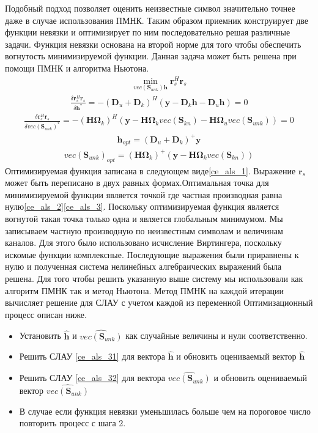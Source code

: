 Подобный подход позволяет оценить неизвестные символ значительно точнее даже  в случае использования ПМНК.  Таким образом приемник конструирует две функции невязки и оптимизирует по ним последовательно решая различные задачи. Функция невязки основана на второй норме для того чтобы обеспечить вогнутость минимизируемой функции. Данная задача может быть решена при помощи ПМНК и алгоритма Ньютона.
   \begin{align}
 \min_{vec(\mathbf{S}_{unk})\mathbf{h}}\mathbf{r}_s^H\mathbf{r}_s
 \label{ce_als_1}
 \end{align}
\begin{align}
\frac{\delta\mathbf{r}_s^H\mathbf{r}_s}{\delta\mathbf{h}^*}=-(\mathbf{D}_u+\mathbf{D}_k)^H(\mathbf{y}-\mathbf{D}_k\mathbf{h}-\mathbf{D}_u\mathbf{h})=0
\label{ce_als_2}
\end{align}
\begin{align}
\frac{\delta\mathbf{r}_s^H\mathbf{r}_s}{\delta vec(\mathbf{S}_{unk})^*}=-(\mathbf{H}\mathbf{\Omega}_k)^H(\mathbf{y}-\mathbf{H}\mathbf{\Omega}_kvec(\mathbf{S}_{kn})-\mathbf{H}\mathbf{\Omega}_uvec(\mathbf{S}_{unk}))=0
\label{ce_als_3}
\end{align}
\begin{align}
\mathbf{h}_{opt}=(\mathbf{D}_u+\mathbf{D}_k)^+\mathbf{y}
\label{ce_als_31}
\end{align}
\begin{align}
vec(\mathbf{S}_{unk})_{opt}=(\mathbf{H}\mathbf{\Omega}_k)^+(\mathbf{y}-\mathbf{H}\mathbf{\Omega}_kvec(\mathbf{S}_{kn}))
\label{ce_als_32}
\end{align}
Оптимизируемая функция записана в следующем виде\eqref{ce_als_1}. Выражение   $\mathbf{r}_s$ может быть переписано в двух равных формах.Оптимальная точка для минимизируемой функции является точкой где частная производная равна нулю\eqref{ce_als_2}\eqref{ce_als_3}. Поскольку оптимизируемая функция является вогнутой такая точка только одна и является глобальным минимумом. Мы записываем частную производную по неизвестным символам и величинам каналов. Для этого было использовано исчисление Виртингера, поскольку искомые функции комплексные. 
Последующие выражения были приравнены к нулю и полученная система нелинейных алгебраических выражений была решена. Для того чтобы решить указанную выше систему мы использовали как алгоритм ПМНК так и метод Ньютона.
Метод ПМНК на каждой итерации вычисляет решение для СЛАУ с учетом каждой из переменной Оптимизационный процесс описан ниже.
\begin{itemize}
\item Установить $\hat{\mathbf{h}}$ и $\hat{vec(\mathbf{S}_{unk})}$ как случайные величины и нули соответственно.
\item Решить СЛАУ \eqref{ce_als_31} для вектора $\hat{\mathbf{h}}$ и обновить оцениваемый вектор $\hat{\mathbf{h}}$
\item Решить СЛАУ \eqref{ce_als_32} для вектора $\hat{vec(\mathbf{S}_{unk})}$ и обновить оцениваемый вектор $\hat{vec(\mathbf{S}_{unk})}$
\item  В случае если функция невязки уменьшилась больше чем на пороговое число повторить процесс с шага 2.
\end{itemize}
